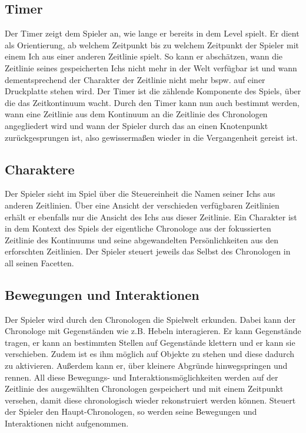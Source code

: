 \subsection{Timer}
Der Timer zeigt dem Spieler an, wie lange er bereits in dem Level spielt. Er dient als Orientierung, ab welchem Zeitpunkt bis zu welchem Zeitpunkt der Spieler mit einem Ich aus einer anderen Zeitlinie spielt. So kann er abschätzen, wann die Zeitlinie seines gespeicherten Ichs nicht mehr in der Welt verfügbar ist und wann dementsprechend der Charakter der Zeitlinie nicht mehr bspw. auf einer Druckplatte stehen wird. Der Timer ist die zählende Komponente des Spiels, über die das Zeitkontinuum wacht. Durch den Timer kann nun auch bestimmt werden, wann eine Zeitlinie aus dem Kontinuum an die Zeitlinie des Chronologen angegliedert wird und wann der Spieler durch das  an einen Knotenpunkt zurückgesprungen ist, also gewissermaßen wieder in die Vergangenheit gereist ist.

\subsection{Charaktere}
Der Spieler sieht im  Spiel über die Steuereinheit die Namen seiner Ichs aus anderen Zeitlinien. Über eine Ansicht der verschieden verfügbaren Zeitlinien erhält er ebenfalls nur die Ansicht des Ichs aus dieser Zeitlinie. Ein Charakter ist in dem Kontext des Spiels der eigentliche Chronologe aus der fokussierten Zeitlinie des Kontinuums und seine abgewandelten Persönlichkeiten aus den erforschten Zeitlinien. Der Spieler steuert jeweils das Selbst des Chronologen in all seinen Facetten.

\subsection{Bewegungen und Interaktionen}
Der Spieler wird durch den Chronologen die Spielwelt erkunden. Dabei kann der Chronologe mit Gegenständen wie z.B. Hebeln interagieren. Er kann Gegenstände tragen, er kann an bestimmten Stellen auf Gegenstände klettern und er kann sie verschieben. Zudem ist es ihm möglich auf Objekte zu stehen und diese dadurch zu aktivieren. Außerdem kann er, über kleinere Abgründe hinwegspringen und rennen. All diese Bewegungs- und Interaktionsmöglichkeiten werden auf der Zeitlinie des ausgewählten Chronologen gespeichert und mit einem Zeitpunkt versehen, damit diese chronologisch wieder rekonstruiert werden können. Steuert der Spieler den Haupt-Chronologen, so werden seine Bewegungen und Interaktionen nicht aufgenommen.

